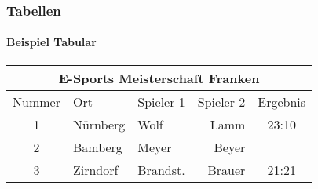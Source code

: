 
%
%


\begin{frame}[t]

\frametitle{Tabellen}
\framesubtitle{Beispiel Tabular}
\begin{footnotesize}
\begin{ttfamily}

\end{ttfamily}
\end{footnotesize}

\begin{tabular}{c|p{40mm}|lr|c}
\multicolumn{5}{c}{E-Sports Meisterschaft Franken}
 \\
\hline
\hline
Nummer & Ort & Spieler 1 & Spieler 2 & Ergebnis \\
\hline
1 & N\"urnberg & Wolf & Lamm & 23:10 \\
\hline
2 & Bamberg & Meyer & Beyer & \\
\hline
3 & Zirndorf & Brandst. & Brauer & 21:21 \\
\hline
\end{tabular}
\end{frame}

